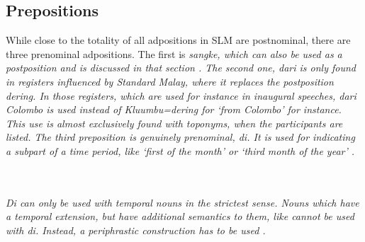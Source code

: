 \subsection{Prepositions}\label{sec:morph:Prepositions}
While close to the totality of all adpositions in SLM are postnominal, there are three prenominal  adpositions. The first is \em sangke\em, which can also be used as a postposition and is discussed in that section . The second one, \em dari \em is only found in registers influenced by Standard Malay, where it replaces the postposition \em dering\em. In those registers, which are used for instance in inaugural speeches, \em dari Colombo \em is used instead of \em Kluumbu=dering \em for `from Colombo' for instance. This use is almost exclusively found with toponyms, when the participants are listed. The third preposition is genuinely prenominal, \em di\em. It is used for indicating a subpart of a time period, like `first of the month' or `third month of the year' .

 \\
 \\





\em Di \em can only be used with temporal nouns in the strictest sense. Nouns which have a temporal extension, but have additional semantics to them, like  cannot be used with \em di\em {}. Instead, a periphrastic construction has to be used .

